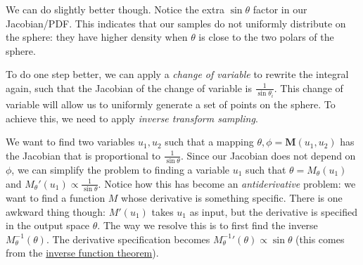 We can do slightly better though. Notice the extra $\sin\theta$ factor in our Jacobian/PDF. This indicates that our samples do not uniformly distribute on the sphere: they have higher density when $\theta$ is close to the two polars of the sphere.

To do one step better, we can apply a \emph{change of variable} to rewrite the integral again, such that the Jacobian of the change of variable is $\frac{1}{\sin\theta_i}$. This change of variable will allow us to uniformly generate a set of points on the sphere. To achieve this, we need to apply \emph{inverse transform sampling}. 

We want to find two variables $u_1, u_2$ such that a mapping $\theta, \phi = \mathbf{M}(u_1, u_2)$ has the Jacobian that is proportional to $\frac{1}{\sin\theta}$. Since our Jacobian does not depend on $\phi$, we can simplify the problem to finding a variable $u_1$ such that $\theta = M_{\theta}(u_1)$ and ${M_{\theta}}'(u_1) \propto \frac{1}{\sin\theta}$. Notice how this has become an \emph{antiderivative} problem: we want to find a function $M$ whose derivative is something specific. There is one awkward thing though: $M'(u_1)$ takes $u_1$ as input, but the derivative is specified in the output space $\theta$. The way we resolve this is to first find the inverse $M_{\theta}^{-1}(\theta)$. The derivative specification becomes ${M_{\theta}^{-1}}'(\theta) \propto \sin\theta$ (this comes from the \href{https://en.wikipedia.org/wiki/Inverse_function_theorem}{inverse function theorem}). 

